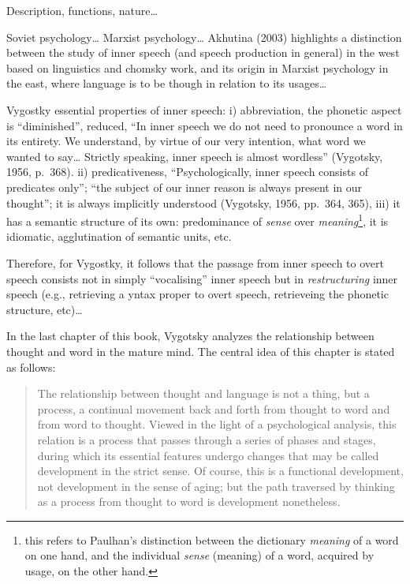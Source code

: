 \documentclass[a4paper,12pt,twoside,openright,oldfontcommands]{memoir}
\let\rmarkdownfootnote\footnote%
\def\footnote{\protect\rmarkdownfootnote}
\begin{document}
Description, functions, nature\ldots{}

Soviet psychology\ldots{} Marxist psychology\ldots{} Akhutina (2003) highlights a distinction between the study of inner speech (and speech production in general) in the west based on linguistics and chomsky work, and its origin in Marxist psychology in the east, where language is to be though in relation to its usages\ldots{}

Vygostky essential properties of inner speech: i) abbreviation, the phonetic aspect is \enquote{diminished}, reduced, \enquote{In inner speech we do not need to pronounce a word in its entirety. We understand, by virtue of our very intention, what word we wanted to say\ldots{} Strictly speaking, inner speech is almost wordless} (Vygotsky, 1956, p.~368). ii) predicativeness, \enquote{Psychologically, inner speech consists of predicates only}; \enquote{the subject of our inner reason is always present in our thought}; it is always implicitly understood (Vygotsky, 1956, pp.~364, 365), iii) it has a semantic structure of its own: predominance of \emph{sense} over \emph{meaning}\footnote{this refers to Paulhan's distinction between the dictionary \emph{meaning} of a word on one hand, and the individual \emph{sense} (meaning) of a word, acquired by usage, on the other hand.}, it is idiomatic, agglutination of semantic units, etc.

Therefore, for Vygostky, it follows that the passage from inner speech to overt speech consists not in simply \enquote{vocalising} inner speech but in \emph{restructuring} inner speech (e.g., retrieving a yntax proper to overt speech, retrieveing the phonetic structure, etc)\ldots{}

In the last chapter of this book, Vygotsky analyzes the relationship between thought and word in the mature mind. The central idea of this chapter is stated as follows:

\begin{quote}
The relationship between thought and language is not a thing, but a process, a continual movement back and forth from thought to word and from word to thought. Viewed in the light of a psychological analysis, this relation is a process that passes through a series of phases and stages, during which its essential features undergo changes that may be called development in the strict sense. Of course, this is a functional development, not development in the sense of aging; but the path traversed by thinking as a process from thought to word is development nonetheless.
\end{quote}
\end{document}
